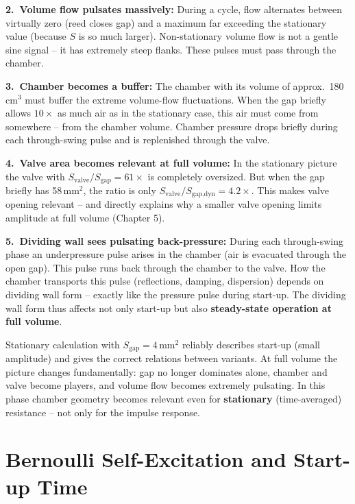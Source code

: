 \documentclass[11pt,a4paper]{article}
\begin{document}
\textbf{2.\ Volume flow pulsates massively:} During a cycle, flow alternates between virtually zero (reed closes gap) and a maximum far exceeding the stationary value (because $S$ is so much larger). Non-stationary volume flow is not a gentle sine signal -- it has extremely steep flanks. These pulses must pass through the chamber.

\textbf{3.\ Chamber becomes a buffer:} The chamber with its volume of approx.\ 180\,cm$^3$ must buffer the extreme volume-flow fluctuations. When the gap briefly allows $10\times$ as much air as in the stationary case, this air must come from somewhere -- from the chamber volume. Chamber pressure drops briefly during each through-swing pulse and is replenished through the valve.

\begin{keybox}
\textbf{4.\ Valve area becomes relevant at full volume:} In the stationary picture the valve with $S_\text{valve}/S_\text{gap} = 61\times$ is completely oversized. But when the gap briefly has 58\,mm$^2$, the ratio is only $S_\text{valve}/S_\text{gap,dyn} = 4.2\times$. This makes valve opening relevant -- and directly explains why a smaller valve opening limits amplitude at full volume (Chapter 5).
\end{keybox}

\textbf{5.\ Dividing wall sees pulsating back-pressure:} During each through-swing phase an underpressure pulse arises in the chamber (air is evacuated through the open gap). This pulse runs back through the chamber to the valve. How the chamber transports this pulse (reflections, damping, dispersion) depends on dividing wall form -- exactly like the pressure pulse during start-up. The dividing wall form thus affects not only start-up but also \textbf{steady-state operation at full volume}.

\begin{keybox}
Stationary calculation with $S_\text{gap} = 4$\,mm$^2$ reliably describes start-up (small amplitude) and gives the correct relations between variants. At full volume the picture changes fundamentally: gap no longer dominates alone, chamber and valve become players, and volume flow becomes extremely pulsating. In this phase chamber geometry becomes relevant even for \textbf{stationary} (time-averaged) resistance -- not only for the impulse response.
\end{keybox}

\section{Bernoulli Self-Excitation and Start-up Time}
\end{document}
